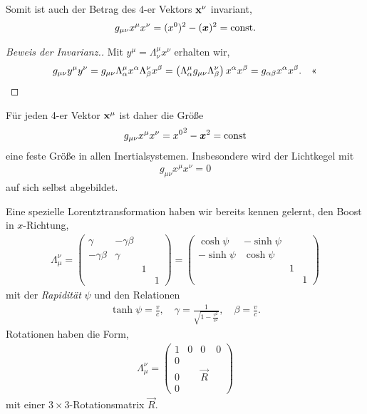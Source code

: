 Somit ist auch der Betrag des $4$-er Vektors $\rvec{x}^\nu$ invariant,
\begin{align*}
g_{\mu\nu}x^\mu x^\nu = (x^0)^2 - (\vec{x})^2 = \const.
\end{align*}
\begin{proof}[Beweis der Invarianz.]
Mit $y^\mu = \Lambda_\nu^\mu x^\nu$ erhalten wir,
\begin{align*}
g_{\mu\nu}y^\mu y^\nu = g_{\mu\nu}\Lambda_{\alpha}^\mu x^\alpha
\Lambda_\beta^\nu x^\beta = \left(\Lambda_\alpha^\mu
g_{\mu\nu}\Lambda_\beta^\nu\right)x^\alpha x^\beta = g_{\alpha\beta}x^\alpha
x^\beta.\qedhere
\end{align*}
\end{proof}

Für jeden 4-er Vektor $\rvec{x}^\mu$ ist daher die Größe
\begin{align*}
g_{\mu\nu}x^\mu x^\nu = {x^0}^2 - \vec{x}^2 = \const 
\end{align*}
eine feste Größe in allen Inertialsystemen. Insbesondere wird der Lichtkegel mit
\begin{align*}
g_{\mu\nu}x^\mu x^\nu = 0
\end{align*}
auf sich selbst abgebildet.

Eine spezielle Lorentztransformation haben wir bereits kennen gelernt, den
Boost in $x$-Richtung,
\begin{align*}
\Lambda_\mu^\nu = \begin{pmatrix}
                  \gamma & -\gamma\beta\\
                  -\gamma\beta & \gamma\\
                  && 1\\
                  &&& 1
                  \end{pmatrix}
= \begin{pmatrix}
\cosh\psi & -\sinh\psi\\
-\sinh\psi & \cosh\psi\\
&& 1\\
&&& 1
\end{pmatrix}
\end{align*}
mit der \emph{Rapidität} $\psi$ und den Relationen
\begin{align*}
\tanh \psi = \frac{v}{c},\quad \gamma =
\frac{1}{\sqrt{1-\frac{v^2}{c^2}}},\quad \beta = \frac{v}{c}.
\end{align*}
Rotationen haben die Form,
\begin{align*}
\Lambda_\mu^\nu = \begin{pmatrix}
                  1 & 0 & 0 & 0\\
                  0 & \\
                  0 & & \vec{R}\\
                  0 
                  \end{pmatrix}
\end{align*}
mit einer $3\times 3$-Rotationsmatrix $\vec{R}$.

